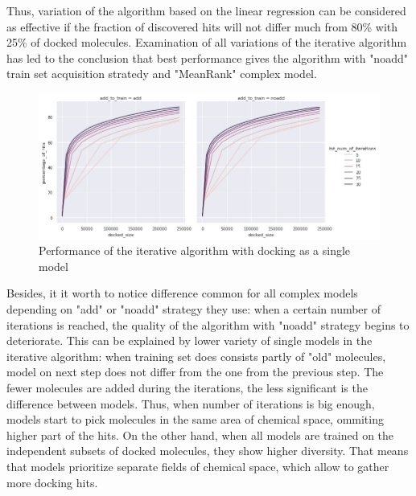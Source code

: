 Thus, variation of the algorithm based on the linear regression can be considered 
as effective if the fraction of discovered hits will not differ much from 80\% with 
25\% of docked molecules. 
Examination of all variations of the iterative algorithm has led to the conclusion 
that best performance gives the algorithm with "noadd" train set acquisition stratedy 
and "MeanRank" complex model.\\ %

\begin{figure}[H]
    \centering
    \includegraphics[width = \linewidth]{Images/DockingIterations.jpg}
    \caption{Performance of the iterative algorithm with docking as a single model}
    \label{docking}
\end{figure}

Besides, it it worth to notice difference common for all complex models depending 
on "add" or "noadd" strategy they use: when a certain number of iterations is reached, 
the quality of the algorithm with "noadd" strategy begins to deteriorate.
This can be explained by lower variety of single models in the iterative algorithm: 
when training set does consists partly of "old" molecules, model on next step does 
not differ from the one from the previous step.
The fewer molecules are added during the iterations, the less significant is the 
difference between models.
Thus, when number of iterations is big enough, models start to pick molecules in 
the same area of chemical space, ommiting higher part of the hits.
On the other hand, when all models are trained on the independent subsets of docked 
molecules, they show higher diversity.
That means that models prioritize separate fields of chemical space, which allow 
to gather more docking hits.\\
\hfill\break
